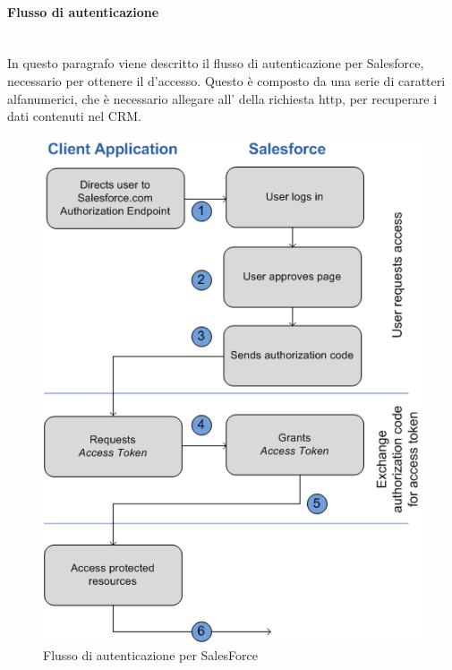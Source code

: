 \documentclass[12pt,a4paper,twoside,openany,english]{book}
\begin{document}
			\paragraph{Flusso di autenticazione}~\\
			In questo paragrafo viene descritto il flusso di autenticazione per Salesforce, necessario per ottenere il  d'accesso.
			Questo  è composto da una serie di caratteri alfanumerici, che è necessario allegare all' della richiesta \gls{http}, per recuperare i dati contenuti nel \gls{CRM}.
				\begin{figure}[!hb]
					\centering
					\includegraphics[width=0.7\linewidth]{images/webServerAuthFlow}
					\caption{Flusso di autenticazione per SalesForce}
					\label{fig:webserverauthflow}
				\end{figure}
\end{document}
